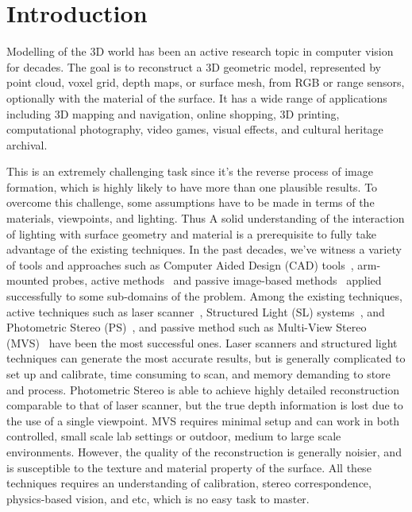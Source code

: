 
\chapter{Introduction}
\label{ch:Introduction}
Modelling of the 3D world has been an active research topic in computer vision for decades. The goal is to reconstruct a 3D geometric model, represented by point cloud, voxel grid, depth maps, or surface mesh, from RGB or range sensors, optionally with the material of the surface. It has a wide range of applications including 3D mapping and navigation, online shopping, 3D printing, computational photography, video games, visual effects, and cultural heritage archival.

This is an extremely challenging task since it's the reverse process of image formation, which is highly likely to have more than one plausible results. To overcome this challenge, some assumptions have to be made in terms of the materials, viewpoints, and lighting. Thus A solid understanding of the interaction of lighting with surface geometry and material is a prerequisite to fully take advantage of the existing techniques. In the past decades, we've witness a variety of tools and approaches such as Computer Aided Design (CAD) tools~\cite{CAD}, arm-mounted probes, active methods~\cite{bernardini2002building,levoy2000digital,Lidar,kinect} and passive image-based methods~\cite{kutulakos2000theory,furukawa2010accurate,faugeras2002variational,goesele2006multi} applied successfully to some sub-domains of the problem. Among the existing techniques, active techniques such as laser scanner~\cite{levoy2000digital}, Structured Light (SL) systems~\cite{bernardini2002building}, and Photometric Stereo (PS)~\cite{woodham1980photometric}, and passive method such as Multi-View Stereo (MVS)~\cite{seitz2006comparison} have been the most successful ones. Laser scanners and structured light techniques can generate the most accurate results, but is generally complicated to set up and calibrate, time consuming to scan, and memory demanding to store and process. Photometric Stereo is able to achieve highly detailed reconstruction comparable to that of laser scanner, but the true depth information is lost due to the use of a single viewpoint. MVS requires minimal setup and can work in both controlled, small scale lab settings or outdoor, medium to large scale environments. However, the quality of the reconstruction is generally noisier, and is susceptible to the texture and material property of the surface. All these techniques requires an understanding of calibration, stereo correspondence, physics-based vision, and etc, which is no easy task to master.

